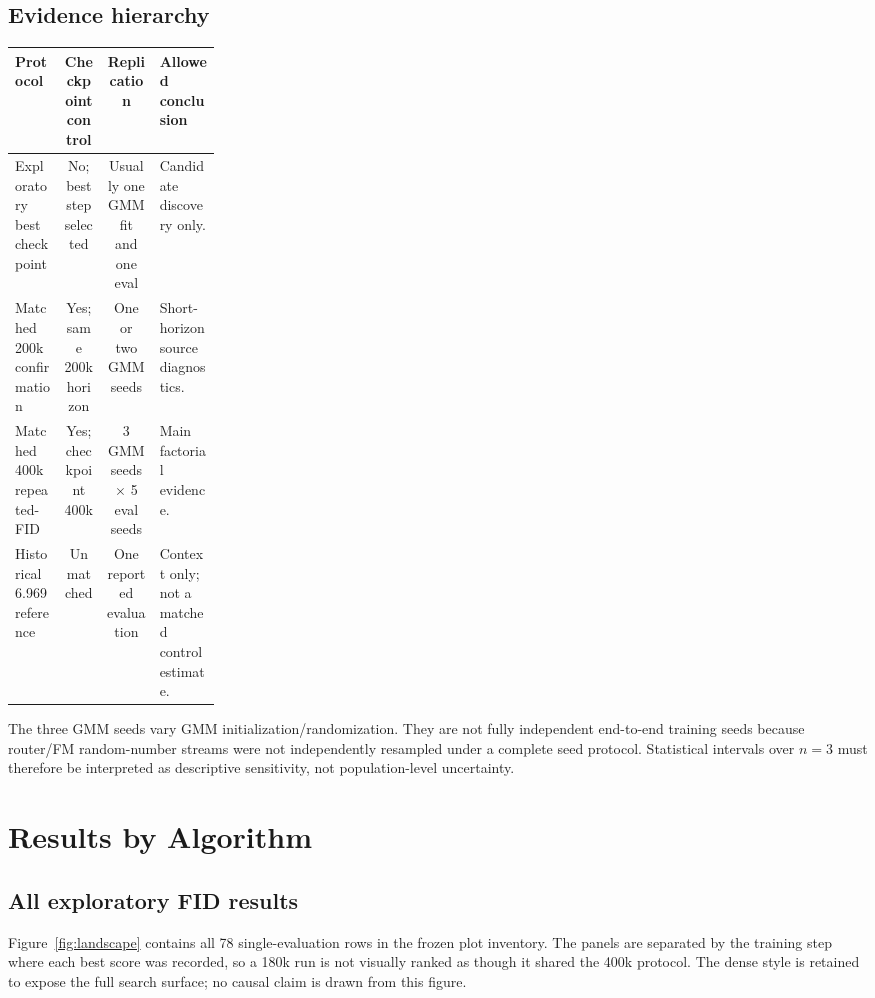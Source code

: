 \documentclass[11pt,a4paper]{article}
\begin{document}
\subsection{Evidence hierarchy}

\begin{center}
\small
\begin{tabularx}{\linewidth}{@{}p{0.24\linewidth}c c Y@{}}
\toprule
\textbf{Protocol} & \textbf{Checkpoint control} &
\textbf{Replication} & \textbf{Allowed conclusion}\\
\midrule
Exploratory best checkpoint & No; best step selected &
Usually one GMM fit and one eval & Candidate discovery only.\\
Matched 200k confirmation & Yes; same 200k horizon &
One or two GMM seeds & Short-horizon source diagnostics.\\
Matched 400k repeated-FID & Yes; checkpoint 400k &
3 GMM seeds \(\times\) 5 eval seeds & Main factorial evidence.\\
Historical 6.969 reference & Unmatched &
One reported evaluation & Context only; not a matched control estimate.\\
\bottomrule
\end{tabularx}
\end{center}

The three GMM seeds vary GMM initialization/randomization. They are not fully
independent end-to-end training seeds because router/FM random-number streams
were not independently resampled under a complete seed protocol. Statistical
intervals over \(n=3\) must therefore be interpreted as descriptive
sensitivity, not population-level uncertainty.

\section{Results by Algorithm}

\subsection{All exploratory FID results}

Figure~\ref{fig:landscape} contains all 78 single-evaluation rows in the frozen
plot inventory. The panels are separated by the training step where each best
score was recorded, so a 180k run is not visually ranked as though it shared
the 400k protocol. The dense style is retained to expose the full search
surface; no causal claim is drawn from this figure.
\end{document}
